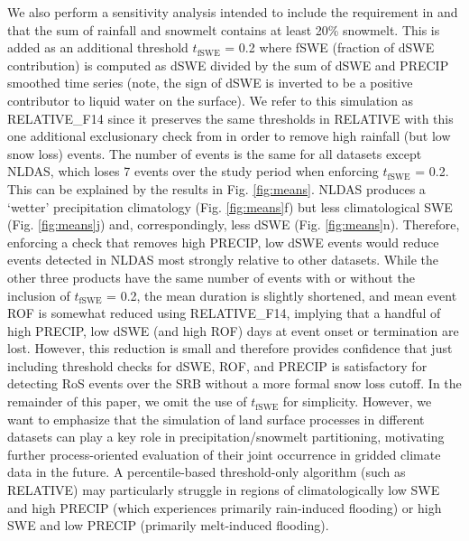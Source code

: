 \documentclass[nhess, manuscript]{copernicus}
\begin{document}
We also perform a sensitivity analysis intended to include the requirement in \citet{freudiger2014large} and \citet{musselman2018projected} that the sum of rainfall and snowmelt contains at least 20\% snowmelt.
This is added as an additional threshold $t_{\textrm{fSWE}}$ = 0.2 where fSWE (fraction of dSWE contribution) is computed as dSWE divided by the sum of dSWE and PRECIP smoothed time series (note, the sign of dSWE is inverted to be a positive contributor to liquid water on the surface).
We refer to this simulation as RELATIVE\_F14 since it preserves the same thresholds in RELATIVE with this one additional exclusionary check from \citet{freudiger2014large} in order to remove high rainfall (but low snow loss) events.
The number of events is the same for all datasets except NLDAS, which loses 7 events over the study period when enforcing $t_{\textrm{fSWE}}$ = 0.2.
This can be explained by the results in Fig. \ref{fig:means}. NLDAS produces a `wetter' precipitation climatology (Fig. \ref{fig:means}f) but less climatological SWE (Fig. \ref{fig:means}j) and, correspondingly, less dSWE (Fig. \ref{fig:means}n).
Therefore, enforcing a check that removes high PRECIP, low dSWE events would reduce events detected in NLDAS most strongly relative to other datasets.
While the other three products have the same number of events with or without the inclusion of $t_{\textrm{fSWE}}$ = 0.2, the mean duration is slightly shortened, and mean event ROF is somewhat reduced using RELATIVE\_F14, implying that a handful of high PRECIP, low dSWE (and high ROF) days at event onset or termination are lost.
However, this reduction is small and therefore provides confidence that just including threshold checks for dSWE, ROF, and PRECIP is satisfactory for detecting RoS events over the SRB without a more formal snow loss cutoff.
In the remainder of this paper, we omit the use of $t_{\textrm{fSWE}}$ for simplicity.
However, we want to emphasize that the simulation of land surface processes in different datasets can play a key role in precipitation/snowmelt partitioning, motivating further process-oriented evaluation of their joint occurrence in gridded climate data in the future.
A percentile-based threshold-only algorithm (such as RELATIVE) may particularly struggle in regions of climatologically low SWE and high PRECIP (which experiences primarily rain-induced flooding) or high SWE and low PRECIP (primarily melt-induced flooding).
\end{document}
